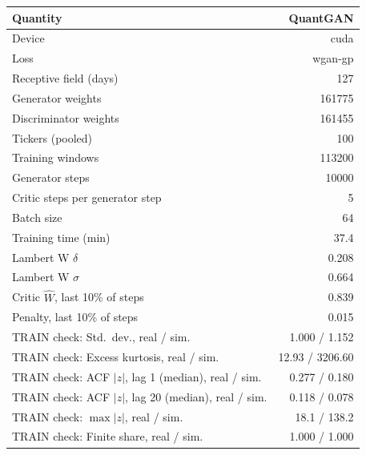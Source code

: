 \begin{tabular}{lr}
\toprule
Quantity & QuantGAN \\
\midrule
Device & cuda \\
Loss & wgan-gp \\
Receptive field (days) & 127 \\
Generator weights & 161775 \\
Discriminator weights & 161455 \\
Tickers (pooled) & 100 \\
Training windows & 113200 \\
Generator steps & 10000 \\
Critic steps per generator step & 5 \\
Batch size & 64 \\
Training time (min) & 37.4 \\
Lambert W $\delta$ & 0.208 \\
Lambert W $\sigma$ & 0.664 \\
Critic $\hat W$, last 10\% of steps & 0.839 \\
Penalty, last 10\% of steps & 0.015 \\
TRAIN check: Std.\ dev., real / sim. & 1.000 / 1.152 \\
TRAIN check: Excess kurtosis, real / sim. & 12.93 / 3206.60 \\
TRAIN check: ACF $|z|$, lag 1 (median), real / sim. & 0.277 / 0.180 \\
TRAIN check: ACF $|z|$, lag 20 (median), real / sim. & 0.118 / 0.078 \\
TRAIN check: $\max |z|$, real / sim. & 18.1 / 138.2 \\
TRAIN check: Finite share, real / sim. & 1.000 / 1.000 \\
\bottomrule
\end{tabular}
